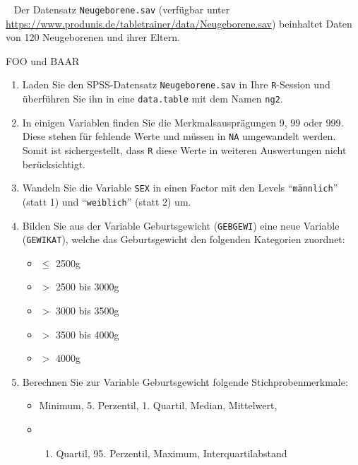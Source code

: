 \documentclass[
  letterpaper,
  DIV=11,
  numbers=noendperiod]{scrartcl}
\providecommand{\tightlist}{%
  \setlength{\itemsep}{0pt}\setlength{\parskip}{0pt}}\usepackage{longtable,booktabs,array}
\begin{document}
\begin{tcolorbox}[enhanced jigsaw, rightrule=.15mm, breakable, arc=.35mm, leftrule=.75mm, bottomrule=.15mm, colframe=quarto-callout-note-color-frame, colback=white, opacityback=0, left=2mm, toprule=.15mm]

      

\textcolor{quarto-callout-note-color}{\faInfo}~ Der Datensatz
\texttt{Neugeborene.sav} (verfügbar unter
\url{https://www.produnis.de/tabletrainer/data/Neugeborene.sav})
beinhaltet Daten von 120 Neugeborenen und ihrer Eltern.

FOO und BAAR

\begin{enumerate}
\def\labelenumi{\alph{enumi})}
\item
  Laden Sie den SPSS-Datensatz \texttt{Neugeborene.sav} in Ihre
  \texttt{R}-Session und überführen Sie ihn in eine \texttt{data.table}
  mit dem Namen \texttt{ng2}.
\item
  In einigen Variablen finden Sie die Merkmalsausprägungen 9, 99 oder
  999. Diese stehen für fehlende Werte und müssen in \texttt{NA}
  umgewandelt werden. Somit ist sichergestellt, dass \texttt{R} diese
  Werte in weiteren Auswertungen nicht berücksichtigt.
\item
  Wandeln Sie die Variable \texttt{SEX} in einen Factor mit den Levels
  ``\texttt{männlich}'' (statt 1) und ``\texttt{weiblich}'' (statt 2)
  um.
\item
  Bilden Sie aus der Variable Geburtsgewicht (\texttt{GEBGEWI}) eine
  neue Variable (\texttt{GEWIKAT}), welche das Geburtsgewicht den
  folgenden Kategorien zuordnet:

  \begin{itemize}
  \tightlist
  \item
    \(\le\) 2500g\\
  \item
    \(>\) 2500 bis 3000g
  \item
    \(>\) 3000 bis 3500g
  \item
    \(>\) 3500 bis 4000g
  \item
    \(>\) 4000g
  \end{itemize}
\item
  Berechnen Sie zur Variable Geburtsgewicht folgende
  Stichprobenmerkmale:

  \begin{itemize}
  \tightlist
  \item
    Minimum, 5. Perzentil, 1. Quartil, Median, Mittelwert,
  \item
    \begin{enumerate}
    \def\labelenumii{\arabic{enumii}.}
    \setcounter{enumii}{2}
    \tightlist
    \item
      Quartil, 95. Perzentil, Maximum, Interquartilabstand
    \end{enumerate}
  \end{itemize}


\end{enumerate}
\end{tcolorbox}
\end{document}
